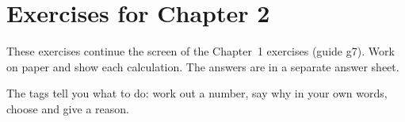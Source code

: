 \section{Exercises for Chapter 2}

These exercises continue the screen of the Chapter~1 exercises (guide g7).
Work on paper and show each calculation. The answers are in a separate
answer sheet.

The tags tell you what to do: \tagcalc{} work out a number,
\tagexplain{} say why in your own words, \tagdecide{} choose and give a
reason.

\begin{center}
\end{center}

